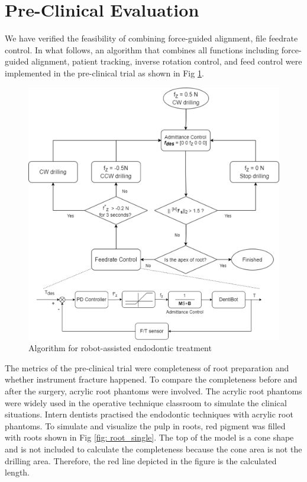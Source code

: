 \section{Pre-Clinical Evaluation}
\hspace*{6mm}We have verified the feasibility of combining force-guided alignment, file feedrate control. In what follows, an algorithm that combines all functions including force-guided alignment, patient tracking, inverse rotation control, and feed control were implemented in the pre-clinical trial as shown in Fig \ref{fig: exp2_motion planning}.
\begin{figure}[htbp]
\begin{center}
\includegraphics[width=1\linewidth]{Images/algorithm.png}
\end{center}
\caption{
Algorithm for robot-assisted endodontic treatment
}\label{fig: exp2_motion planning}
\end{figure}
\par
The metrics of the pre-clinical trial were completeness of root preparation and whether instrument fracture happened. To compare the completeness before and after the surgery, acrylic root phantoms were involved. The acrylic root phantoms were widely used in the operative technique classroom to simulate the clinical situations. Intern dentists practised the endodontic techniques with acrylic root phantoms. To simulate and visualize the pulp in roots, red pigment was filled with roots shown in Fig \ref{fig: root_single}. The top of the model is a cone shape and is not included to calculate the completeness because the cone area is not the drilling area. Therefore, the red line depicted in the figure is the calculated length. 
